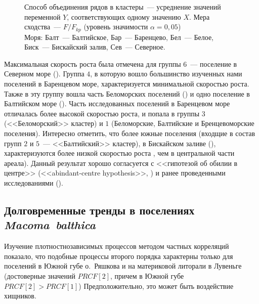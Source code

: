 {\begin{figure}[ht]
{Способ объединения рядов в кластеры~--- усреднение значений переменной $Y$, соответствующих одному значению $X$.
Мера сходства~--- $F/F_{kp}$ (уровень значимости $\alpha = 0,05$)\\
Моря: Балт~--- Балтийское, Бар~--- Баренцево, Бел~--- Белое, Биск~--- Бискайский залив, Сев~--- Северное.}
		\label{ris:growth_cluster_literature}
	\end{figure}
Максимальная скорость роста была отмечена для группы $6$~--- поселение в Северном море (\cite{Vogel_1959}). 
Группа $4$, в которую вошло большинство изученных нами поселений в Баренцевом море, характеризуется минимальной скоростью роста.
Также в эту группу вошла часть Беломорских поселений (\cite{Semenova_1970}) и одно поселение в Балтийском море (\cite{Bergh_1974}).
Часть исследованных поселений в Баренцевом море отличалась более высокой скоростью роста, и попала в группы $3$ (<<Беломорский>> кластер) и $1$ (Беломорские, Балтийские и Бренцевоморские поселения).
Интересно отметить, что более южные поселения (входщие в состав групп $2$ и $5$~--- <<Балтийский>> кластер), в Бискайском заливе (\cite{Bachelet_1980}), характеризуются более низкой скоростью роста , чем в центральной части ареала).
Данный результат хорошо согласуется с <<гипотезой об обилии в центре>> (<<abindant-centre hypothesis>>, \cite{Sagarin_et_al_2006}) и ранее проведенными исследованиями (\cite{Beukema_Meehan_1985, Hummel_et_al_1998}).

\subsection*{Долговременные тренды в поселениях \textit{Macoma~balthica}}
Изучение плотностнозависимых процессов методом частных корреляций показало, что подобные процессы второго порядка характерны только для поселений в Южной губе о.~Ряшкова и на материковой литорали в Лувеньге (достоверные значений $PRCF[2]$, причем в Южной губе $PRCF[2] > PRCF[1]$)
Предположительно, это может быть воздействие хищников.

}
